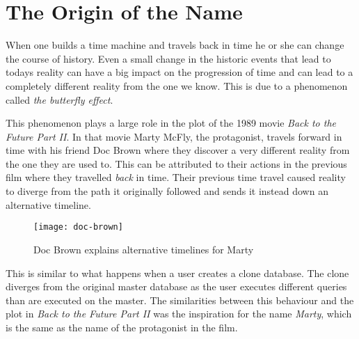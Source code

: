 \chapter{The Origin of the Name}
\label{ch:appendix-name}
When one builds a time machine and travels back in time he or she can change the course of history.
Even a small change in the historic events that lead to todays reality can have a big impact on the progression of time and can lead to a completely different reality from the one we know.
This is due to a phenomenon called \textit{the butterfly effect}.

This phenomenon plays a large role in the plot of the 1989 movie \textit{Back to the Future Part II}.
In that movie Marty McFly, the protagonist, travels forward in time with his friend Doc Brown where they discover a very different reality from the one they are used to.
This can be attributed to their actions in the previous film where they travelled \textit{back} in time.
Their previous time travel caused reality to diverge from the path it originally followed and sends it instead down an alternative timeline.

\begin{figure}[h!]
  \centering
    \texttt{[image: doc-brown]}
  \caption{Doc Brown explains alternative timelines for Marty}
  \label{fig:history-data-table}
\end{figure}

This is similar to what happens when a user creates a clone database.
The clone diverges from the original master database as the user executes different queries than are executed on the master.
The similarities between this behaviour and the plot in \textit{Back to the Future Part II} was the inspiration for the name \textit{Marty}, which is the same as the name of the protagonist in the film.